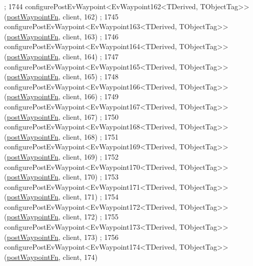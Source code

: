 \begin{DoxyCode}
      ;
1744     configurePostEvWaypoint<EvWaypoint162<TDerived, TObjectTag>>(\hyperlink{classcl__move__base__z_1_1WaypointEventDispatcher_a964a57fcce5d48ec60243230722d8dd7}{postWaypointFn}, client, 162)
      ;
1745     configurePostEvWaypoint<EvWaypoint163<TDerived, TObjectTag>>(\hyperlink{classcl__move__base__z_1_1WaypointEventDispatcher_a964a57fcce5d48ec60243230722d8dd7}{postWaypointFn}, client, 163)
      ;
1746     configurePostEvWaypoint<EvWaypoint164<TDerived, TObjectTag>>(\hyperlink{classcl__move__base__z_1_1WaypointEventDispatcher_a964a57fcce5d48ec60243230722d8dd7}{postWaypointFn}, client, 164)
      ;
1747     configurePostEvWaypoint<EvWaypoint165<TDerived, TObjectTag>>(\hyperlink{classcl__move__base__z_1_1WaypointEventDispatcher_a964a57fcce5d48ec60243230722d8dd7}{postWaypointFn}, client, 165)
      ;
1748     configurePostEvWaypoint<EvWaypoint166<TDerived, TObjectTag>>(\hyperlink{classcl__move__base__z_1_1WaypointEventDispatcher_a964a57fcce5d48ec60243230722d8dd7}{postWaypointFn}, client, 166)
      ;
1749     configurePostEvWaypoint<EvWaypoint167<TDerived, TObjectTag>>(\hyperlink{classcl__move__base__z_1_1WaypointEventDispatcher_a964a57fcce5d48ec60243230722d8dd7}{postWaypointFn}, client, 167)
      ;
1750     configurePostEvWaypoint<EvWaypoint168<TDerived, TObjectTag>>(\hyperlink{classcl__move__base__z_1_1WaypointEventDispatcher_a964a57fcce5d48ec60243230722d8dd7}{postWaypointFn}, client, 168)
      ;
1751     configurePostEvWaypoint<EvWaypoint169<TDerived, TObjectTag>>(\hyperlink{classcl__move__base__z_1_1WaypointEventDispatcher_a964a57fcce5d48ec60243230722d8dd7}{postWaypointFn}, client, 169)
      ;
1752     configurePostEvWaypoint<EvWaypoint170<TDerived, TObjectTag>>(\hyperlink{classcl__move__base__z_1_1WaypointEventDispatcher_a964a57fcce5d48ec60243230722d8dd7}{postWaypointFn}, client, 170)
      ;
1753     configurePostEvWaypoint<EvWaypoint171<TDerived, TObjectTag>>(\hyperlink{classcl__move__base__z_1_1WaypointEventDispatcher_a964a57fcce5d48ec60243230722d8dd7}{postWaypointFn}, client, 171)
      ;
1754     configurePostEvWaypoint<EvWaypoint172<TDerived, TObjectTag>>(\hyperlink{classcl__move__base__z_1_1WaypointEventDispatcher_a964a57fcce5d48ec60243230722d8dd7}{postWaypointFn}, client, 172)
      ;
1755     configurePostEvWaypoint<EvWaypoint173<TDerived, TObjectTag>>(\hyperlink{classcl__move__base__z_1_1WaypointEventDispatcher_a964a57fcce5d48ec60243230722d8dd7}{postWaypointFn}, client, 173)
      ;
1756     configurePostEvWaypoint<EvWaypoint174<TDerived, TObjectTag>>(\hyperlink{classcl__move__base__z_1_1WaypointEventDispatcher_a964a57fcce5d48ec60243230722d8dd7}{postWaypointFn}, client, 174)

\end{DoxyCode}
